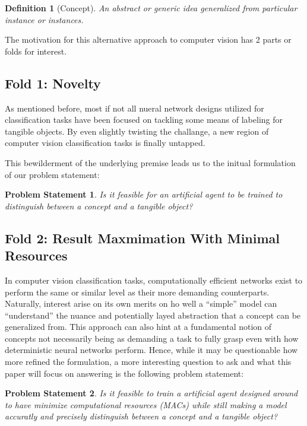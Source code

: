\documentclass[conference]{IEEEtran}
\newtheorem{definition}{Definition}
\newtheorem{question}{Problem Statement}
\begin{document}
\begin{definition}[Concept]

    An abstract or generic idea generalized from particular instance or
    instances.%
    \label{ConceptDefinition}
\end{definition}

The motivation for this alternative approach to computer vision has 2 parts or
folds for interest.


\subsection{Fold 1: Novelty}

As mentioned before, most if not all nueral network designs utilized for
classification tasks have been focused on tackling some means of labeling
for tangible objects. By even slightly twisting the challange, a new region of
computer vision classification tasks is finally untapped.

This bewilderment of the underlying premise leads us to the initual formulation
of our problem statement:


\begin{question}
    Is it feasible for an artificial agent to be trained to  distinguish between
    a concept and a tangible object?
\end{question}


\subsection{Fold 2: Result Maxmimation With Minimal Resources}

In computer vision classification tasks, computationally efficient networks
exist to perform the same or similar level as their more demanding counterparts.
Naturally, interest arise on its own merits on ho well a ``simple'' model can
``understand'' the nuance  and potentially layed abstraction that a concept can
be generalized from. This approach can also hint at a fundamental notion of
concepts not necessarily being as demanding a task to fully grasp even with
how deterministic neural networks perform. Hence, while it may be questionable
how more refined the formulation, a more interesting question to ask and what
this paper will focus on answering is the following problem statement:


\begin{question}
    Is it feasible to train a artificial agent designed around to have  minimize
    computational resources (MACs) while still making a model accuratly and
    precisely distinguish between a concept and a tangible object?%
    \label{question:MainQuestion}
\end{question}
\end{document}
